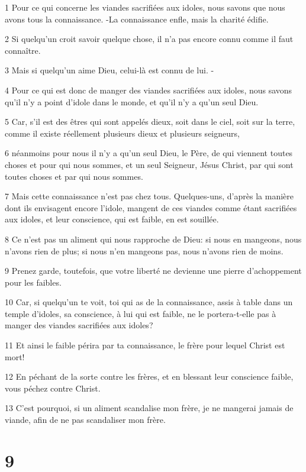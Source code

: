 \par 1 Pour ce qui concerne les viandes sacrifiées aux idoles, nous savons que nous avons tous la connaissance. -La connaissance enfle, mais la charité édifie.
\par 2 Si quelqu'un croit savoir quelque chose, il n'a pas encore connu comme il faut connaître.
\par 3 Mais si quelqu'un aime Dieu, celui-là est connu de lui. -
\par 4 Pour ce qui est donc de manger des viandes sacrifiées aux idoles, nous savons qu'il n'y a point d'idole dans le monde, et qu'il n'y a qu'un seul Dieu.
\par 5 Car, s'il est des êtres qui sont appelés dieux, soit dans le ciel, soit sur la terre, comme il existe réellement plusieurs dieux et plusieurs seigneurs,
\par 6 néanmoins pour nous il n'y a qu'un seul Dieu, le Père, de qui viennent toutes choses et pour qui nous sommes, et un seul Seigneur, Jésus Christ, par qui sont toutes choses et par qui nous sommes.
\par 7 Mais cette connaissance n'est pas chez tous. Quelques-uns, d'après la manière dont ils envisagent encore l'idole, mangent de ces viandes comme étant sacrifiées aux idoles, et leur conscience, qui est faible, en est souillée.
\par 8 Ce n'est pas un aliment qui nous rapproche de Dieu: si nous en mangeons, nous n'avons rien de plus; si nous n'en mangeons pas, nous n'avons rien de moins.
\par 9 Prenez garde, toutefois, que votre liberté ne devienne une pierre d'achoppement pour les faibles.
\par 10 Car, si quelqu'un te voit, toi qui as de la connaissance, assis à table dans un temple d'idoles, sa conscience, à lui qui est faible, ne le portera-t-elle pas à manger des viandes sacrifiées aux idoles?
\par 11 Et ainsi le faible périra par ta connaissance, le frère pour lequel Christ est mort!
\par 12 En péchant de la sorte contre les frères, et en blessant leur conscience faible, vous péchez contre Christ.
\par 13 C'est pourquoi, si un aliment scandalise mon frère, je ne mangerai jamais de viande, afin de ne pas scandaliser mon frère.

\chapter{9}

